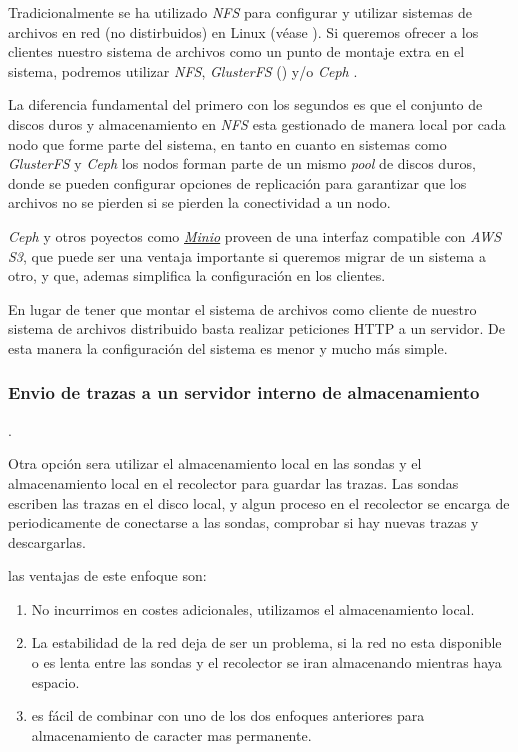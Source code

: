 Tradicionalmente se ha utilizado \emph{NFS} para configurar y utilizar sistemas de archivos en red (no distirbuidos) en Linux (véase \cite{wiki-nfs}). 
Si queremos ofrecer a los clientes nuestro sistema de archivos como un punto de montaje extra en el sistema, podremos utilizar
\emph{NFS}, \emph{GlusterFS} (\cite{wiki-glusterfs}) y/o \emph{Ceph} \cite{wiki-ceph}.

La diferencia fundamental del primero con los segundos es que el conjunto de discos duros y almacenamiento en \emph{NFS} esta gestionado de manera local
por cada nodo que forme parte del sistema, en tanto en cuanto en sistemas como \emph{GlusterFS} y \emph{Ceph} los nodos forman parte de un 
mismo \emph{pool} de discos duros, donde se pueden configurar opciones de replicación para garantizar que los archivos no se pierden si 
se pierden la conectividad a un nodo.

\emph{Ceph} y otros poyectos como \emph{\href{https://minio.io/}{Minio}} proveen de una interfaz compatible con \emph{AWS S3}, que puede ser una ventaja importante
si queremos migrar de un sistema a otro, y que, ademas simplifica la configuración en los clientes.

En lugar de tener que montar el sistema de archivos como cliente de nuestro sistema de archivos distribuido basta 
realizar peticiones HTTP a un servidor. De esta manera la configuración del sistema es menor y mucho más simple.

\subsubsection{Envio de trazas a un servidor interno de almacenamiento}.

Otra opción sera utilizar el almacenamiento local en las sondas y el almacenamiento local en el recolector para guardar las trazas.
Las sondas escriben las trazas en el disco local, y algun proceso en el recolector se encarga de periodicamente de conectarse a las sondas,
comprobar si hay nuevas trazas y descargarlas.

las ventajas de este enfoque son:
\begin{enumerate}
    \item No incurrimos en costes adicionales, utilizamos el almacenamiento local.
    \item La estabilidad de la red deja de ser un problema, si la red no esta disponible o es lenta entre las sondas y el recolector se iran almacenando mientras haya espacio.
    \item es fácil de combinar con uno de los dos enfoques anteriores para almacenamiento de caracter mas permanente.
\end{enumerate}

